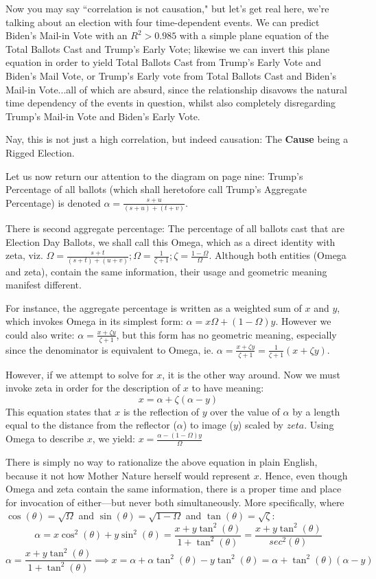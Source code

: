 Now you may say ``correlation is not causation," but let's get real here, we're talking about an election with four time-dependent events. We can predict Biden's Mail-in Vote with an $R^2>0.985$ with a simple plane equation of the Total Ballots Cast and Trump's Early Vote; likewise we can invert this plane equation in order to yield Total Ballots Cast from Trump's Early Vote and Biden's Mail Vote, or Trump's Early vote from Total Ballots Cast and Biden's Mail-in Vote...all of which are absurd, since the relationship disavows the natural time dependency of the events in question, whilst also completely disregarding Trump's Mail-in Vote and Biden's Early Vote.

Nay, this is not just a high correlation, but indeed causation: The \textbf{Cause} being a Rigged Election.

Let us now return our attention to the diagram on page nine: Trump's Percentage of all ballots (which shall heretofore call Trump's Aggregate Percentage) is denoted $\alpha=\frac{s+u}{(s+u)+(t+v)}$. 

There is second aggregate percentage: The percentage of all ballots cast that are Election Day Ballots, we shall call this Omega, which as a direct identity with zeta, viz. $\Omega=\frac{s+t}{(s+t)+(u+v)}; \Omega=\frac{1}{\zeta+1}; \zeta=\frac{1-\Omega}{\Omega}$. Although both entities (Omega and zeta), contain the same information, their usage and geometric meaning manifest different.

For instance, the aggregate percentage is written as a weighted sum of $x$ and $y$, which invokes Omega in its simplest form: $\alpha=x\Omega+(1-\Omega)y$. However we could also write: $\alpha=\frac{x+\zeta y}{\zeta+1}$, but this form has no geometric meaning, especially since the denominator is equivalent to Omega, ie. $\alpha=\frac{x+\zeta y}{\zeta+1}=\frac{1}{\zeta+1}(x+\zeta y)$.

However, if we attempt to solve for $x$, it is the other way around. Now we must invoke zeta in order for the description of $x$ to have meaning: $$x=\alpha+\zeta(\alpha-y)$$
This equation states that $x$ is the reflection of $y$ over the value of $\alpha$ by a length equal to the distance from the reflector ($\alpha$) to image ($y$) scaled by $zeta$.
\newpage
Using Omega to describe $x$, we yield:
$x=\frac{\alpha-(1-\Omega)y}{\Omega}$

There is simply no way to rationalize the above equation in plain English, because it not how Mother Nature herself would represent $x$. Hence, even though Omega and zeta contain the same information, there is a proper time and place for invocation of either---but never both simultaneously. More specifically, where $\cos(\theta)=\sqrt{\Omega}$ and $\sin(\theta)=\sqrt{1-\Omega}$ and $\tan(\theta)=\sqrt{\zeta}$:
$$\alpha=x\cos^2(\theta)+y\sin^2(\theta)=\frac{x+y\tan^2(\theta)}{1+\tan^2(\theta)}=\frac{x+y\tan^2(\theta)}{sec^2(\theta)}$$ 
$$\alpha=\frac{x+y\tan^2(\theta)}{1+\tan^2(\theta)} \implies x=\alpha+\alpha\tan^2(\theta)-y\tan^2(\theta)=\alpha+\tan^2(\theta)(\alpha-y)$$


